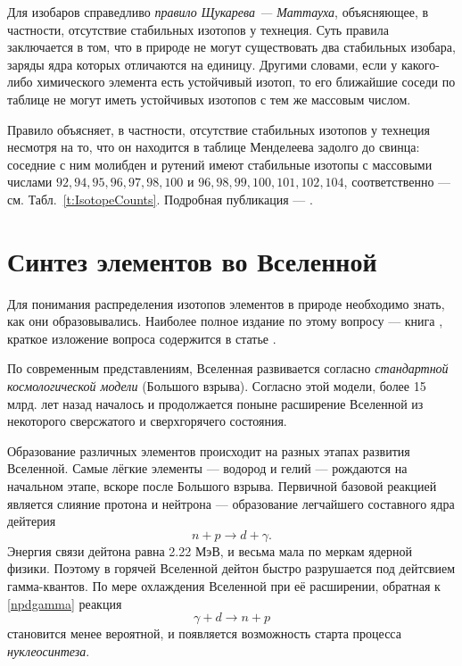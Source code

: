 \documentclass[a5paper,openany]{book}
\begin{document}
Для изобаров справедливо \emph{правило Щукарева — Маттауха}, объясняющее, в частности, отсутствие стабильных изотопов у технеция. 
Суть правила заключается в том, что в природе не могут существовать два стабильных изобара, заряды ядра которых отличаются на единицу. Другими словами, если у какого-либо химического элемента есть устойчивый изотоп, то его ближайшие соседи по таблице не могут иметь устойчивых изотопов с тем же массовым числом. 

Правило объясняет, в частности, отсутствие стабильных изотопов у технеция несмотря на то, что он находится в таблице Менделеева задолго до свинца: соседние с ним молибден и рутений имеют стабильные изотопы с массовыми числами $92, 94, 95, 96, 97, 98, 100$ и $96, 98, 99, 100, 101, 102, 104$, соответственно --- см. Табл.~\ref{t:IsotopeCounts}.
Подробная публикация --- \cite{Technetium2017}.



\section{Синтез элементов во Вселенной}\label{s:Nucleosynthesis}

Для понимания распределения изотопов элементов в природе необходимо знать, как они образовывались. Наиболее  полное издание по этому вопросу --- книга \cite{Nucleosynthesis}, краткое изложение вопроса содержится в статье \cite{ElementsOrigin}. 

По современным представлениям, Вселенная развивается согласно \emph{стандартной космологической модели} (Большого взрыва). Согласно этой модели, более 15 млрд. лет назад началось и продолжается поныне расширение Вселенной из некоторого сверсжатого и сверхгорячего состояния. 

Образование различных элементов происходит на разных этапах развития Вселенной. Самые лёгкие элементы --- водород и гелий --- рождаются на начальном этапе, вскоре после Большого взрыва. Первичной базовой реакцией является слияние протона и нейтрона --- образование легчайшего составного ядра  дейтерия 
\begin{equation}\label{npdgamma}
	n + p \longrightarrow d + \gamma.
\end{equation}
Энергия связи дейтона равна 2.22 МэВ, и весьма мала по меркам ядерной физики. Поэтому в горячей Вселенной дейтон быстро разрушается под дейтсвием гамма-квантов. По мере охлаждения Вселенной при её расширении, обратная к \eqref{npdgamma} реакция 
\begin{equation}\label{gammad}
		\gamma +	d  \longrightarrow n + p 
\end{equation}
становится менее вероятной, и появляется возможность старта процесса \emph{нуклеосинтеза}. 
\end{document}
